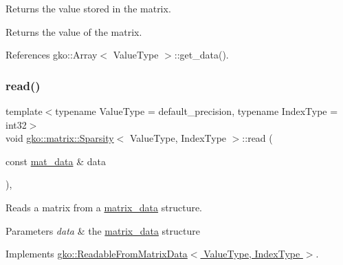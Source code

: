 Returns the value stored in the matrix. 

\begin{DoxyReturn}{Returns}
the value of the matrix. 
\end{DoxyReturn}


References gko\+::\+Array$<$ Value\+Type $>$\+::get\+\_\+data().

\mbox{\label{classgko_1_1matrix_1_1Sparsity_a9515162e2e6bca7541a0cbcc8f07c48f}} 
\subsubsection{\texorpdfstring{read()}{read()}}
{\footnotesize\ttfamily template$<$typename Value\+Type  = default\+\_\+precision, typename Index\+Type  = int32$>$ \\
void \hyperlink{classgko_1_1matrix_1_1Sparsity}{gko\+::matrix\+::\+Sparsity}$<$ Value\+Type, Index\+Type $>$\+::read (\begin{DoxyParamCaption}\item[{const \hyperlink{structgko_1_1matrix__data}{mat\+\_\+data} \&}]{data }\end{DoxyParamCaption})\hspace{0.3cm}{\ttfamily [override]}, {\ttfamily [virtual]}}



Reads a matrix from a \hyperlink{structgko_1_1matrix__data}{matrix\+\_\+data} structure. 


\begin{DoxyParams}{Parameters}
{\em data} & the \hyperlink{structgko_1_1matrix__data}{matrix\+\_\+data} structure \\
\hline
\end{DoxyParams}


Implements \hyperlink{classgko_1_1ReadableFromMatrixData_add5c12e23b3ac3c8fbd607fa5a9656bb}{gko\+::\+Readable\+From\+Matrix\+Data$<$ Value\+Type, Index\+Type $>$}.

\mbox{\label{classgko_1_1matrix_1_1Sparsity_a505956075f66c61668295f4b37506bfd}} 
